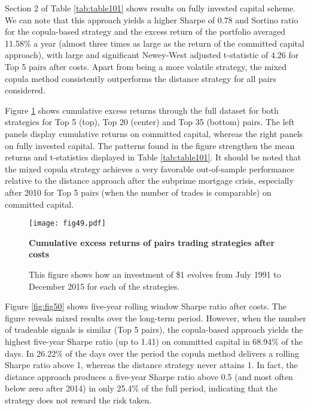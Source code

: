 \documentclass[a4paper]{article}
\begin{document}
\vspace{0.6cm}

Section 2 of Table \ref{tab:table101} shows results on fully invested capital scheme. We can note that this approach yields a higher Sharpe of 0.78 and Sortino ratio for the copula-based strategy and the excess return of the portfolio averaged 11.58\% a year (almost three times as large as the return of the committed capital approach), with large and significant Newey-West adjusted t-statistic of 4.26 for Top 5 pairs after costs. Apart from being a more volatile strategy, the mixed copula method consistently outperforms the distance strategy for all pairs considered.

Figure \ref{fig:fig49} shows cumulative excess returns through the full dataset for both strategies for Top 5 (top), Top 20 (center) and Top 35 (bottom) pairs. The left panels display cumulative returns on committed capital, whereas the right panels on fully invested capital. The patterns found in the figure strengthen the mean returns and t-statistics displayed in Table \ref{tab:table101}. It should be noted that the mixed copula strategy achieves a very favorable out-of-sample performance relative to the distance approach after the subprime mortgage crisis, especially after 2010 for Top 5 pairs (when the number of trades is comparable) on committed capital. 

\begin{figure}[H]
	\centering
	\texttt{[image: fig49.pdf]}
	\captionsetup{justification=raggedright,
		singlelinecheck=false
	}
	\caption{\textbf{Cumulative excess returns of pairs trading strategies after costs}}
	\caption*{\scriptsize This figure shows how an investment of \$1 evolves from July 1991 to December 2015 for each of the strategies.}
	\label{fig:fig49}
\end{figure}

Figure \ref{fig:fig50} shows five-year rolling window Sharpe ratio after costs. The figure reveals mixed results over the long-term period. However, when the number of tradeable signals is similar (Top 5 pairs), the copula-based approach yields the highest five-year Sharpe ratio (up to 1.41) on committed capital in 68.94\% of the days. In 26.22\% of the days over the period the copula method delivers a rolling Sharpe ratio above 1, whereas the distance strategy never attains 1. In fact, the distance approach produces a five-year Sharpe ratio above 0.5 (and most often below zero after 2014) in only 25.4\% of the full period, indicating that the strategy does not reward the risk taken.
\end{document}
